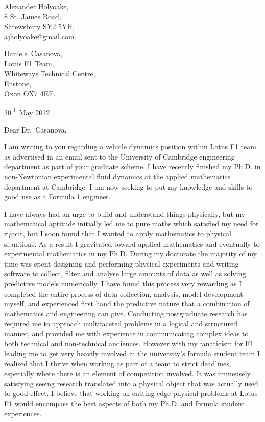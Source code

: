 \documentclass[a4paper,10pt]{article}
\newcommand{\sendfirst}{Daniele}
\newcommand{\sendlast}{Casanova}
\newcommand{\sendtitle}{Dr.}
\newcommand{\sendto}{\sendfirst\ \sendlast}
\begin{document}
\begin{flushright}
Alexander Holyoake, \\ 8 St. James Road, \\ Shrewsbury SY2 5YH, \\ ajholyoake@gmail.com.
\end{flushright}

\begin{flushleft} 
\sendto, \\ Lotus F1 Team, \\ Whiteways Technical Centre, \\ Enstone, \\ Oxon OX7 4EE.
\end{flushleft}

\begin{flushright}
30\textsuperscript{th} May 2012
\end{flushright}


\noindent Dear \sendtitle\ \sendlast,

I am writing to you regarding a vehicle dynamics position within Lotus F1 team as advertised in an email sent to the University of Cambridge engineering department as part of your graduate scheme. I have recently finished my Ph.D. in non-Newtonian experimental fluid dynamics at the applied mathematics department at Cambridge. I am now seeking to put my knowledge and skills to good use as a Formula 1 engineer.

I have always had an urge to build and understand things physically, but my mathematical aptitude initially led me to pure maths which satisfied my need for rigour, but I soon found that I wanted to apply mathematics to physical situations. As a result I gravitated toward applied mathematics and eventually to experimental mathematics in my Ph.D. During my doctorate the majority of my time was spent designing and performing physical experiments and writing software to collect, filter and analyse large amounts of data as well as solving predictive models numerically. I have found this process very rewarding as I completed the entire process of data collection, analysis, model development myself, and experienced first hand the predictive nature that a combination of mathematics and engineering can give. Conducting postgraduate research has required me to approach multifaceted problems in a logical and structured manner, and provided me with experience in communicating complex ideas to both technical and non-technical audiences.  However with my fanaticism for F1 leading me to get very heavily involved in the university's formula student team I realised that I thrive when working as part of a team to strict deadlines, especially where there is an element of competition involved. It was immensely satisfying seeing research translated into a physical object that was actually used to good effect. I believe that working on cutting edge physical problems at Lotus F1 would encompass the best aspects of both my Ph.D. and formula student experiences.
\end{document}
